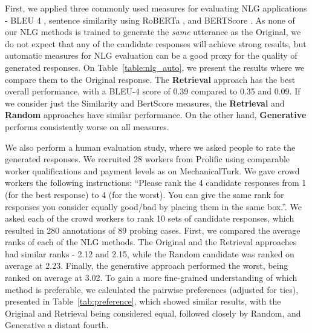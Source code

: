\documentclass[acmsmall,manuscript,screen]{acmart}
\begin{document}
\begin{table}[t!]
    \centering
    \caption{The table reports pairwise preferences in columns over rows, i.e.\ the first column reports the preference of the Original text vs the other 3 methods.}
    \label{tab:preference}
\end{table}



First, we applied three commonly used measures for evaluating NLG applications - BLEU 4 \cite{bleu}, sentence similarity using RoBERTa \cite{Liu2019RoBERTaAR}, and BERTScore \cite{bertscore}. As none of our NLG methods is trained to generate the \textit{same} utterance as the Original, we do not expect that any of the candidate responses will achieve strong results, but automatic measures for NLG evaluation can be a good proxy for the quality of generated responses.
On Table~\ref{table:nlg_auto}, we present the results where we compare them to the Original response. The \textbf{Retrieval} approach has the best overall performance, with a BLEU-4 score of 0.39 compared to 0.35 and 0.09. If we consider just the Similarity and BertScore measures, the \textbf{Retrieval} and \textbf{Random} approaches have similar performance. On the other hand, \textbf{Generative} performs consistently worse on all measures. 

We also perform a human evaluation study, where we asked people to rate the generated responses. We recruited 28 workers from Prolific using comparable worker qualifications and payment levels as on MechanicalTurk. We gave crowd workers the following instructions: ``Please rank the 4 candidate responses from 1 (for the best response) to 4 (for the worst). You can give the same rank for responses you consider equally good/bad by placing them in the same box.''. We asked each of the crowd workers to rank 10 sets of candidate responses, which resulted in 280 annotations of 89 probing cases. First, we compared the average ranks of each of the NLG methods. The Original and the Retrieval approaches had similar ranks - 2.12 and 2.15, while the Random candidate was ranked on average at 2.23. Finally, the generative approach performed the worst, being ranked on average at 3.02. To gain a more fine-grained understanding of which method is preferable, we calculated the pairwise preferences (adjusted for ties), presented in Table~\ref{tab:preference}, which showed similar results, with the Original and Retrieval being considered equal, followed closely by Random, and Generative a distant fourth.
\end{document}
